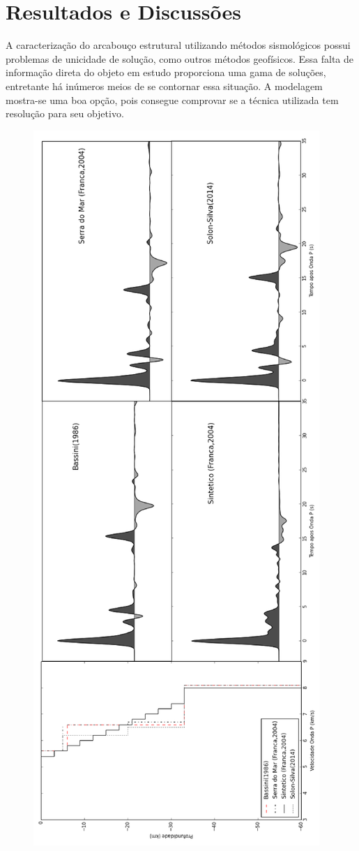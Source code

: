 \chapter{Resultados e Discussões}	

A caracterização do arcabouço estrutural utilizando métodos sismológicos possui problemas de unicidade de solução, como outros métodos geofísicos.  Essa falta de informação direta do objeto em estudo proporciona uma gama de soluções, entretante há inúmeros meios de se contornar essa situação. A modelagem mostra-se uma boa opção, pois consegue comprovar se a técnica utilizada tem resolução para seu objetivo.

\begin{figure}[!ht]
\centering
\includegraphics[scale=0.4]{modelagem_RF.png}

\end{figure}
